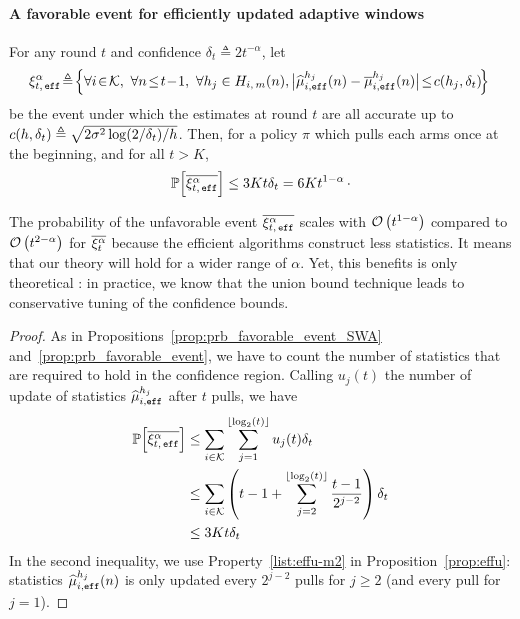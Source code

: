 \paragraph{A favorable event for efficiently updated adaptive windows}
\begin{proposition}
\label{prop:prb_favorable_event_eff}
For any round $t$ and confidence $\delta_{t} \triangleq 2t^{-\alpha}$, let 
%
\begin{equation*}
\!\HPeff\! \triangleq\! \Big\{ \forall i\!\in\!\arms,\ \forall n \!\leq\! t\!-\!1 ,\ \forall h_j \in \Him(n), \big| \hmueff(n) - \bmueff(n) \big| \!\leq\! c(h_j, \delta_{t}) \!\Big\}
\end{equation*}
 be the event under which the estimates at round $t$  are all accurate up to $c(h,\delta_{t}) \triangleq \sqrt{2 \sigma^2\log(2/\delta_t)/h}$. Then, for a policy $\pi$ which pulls each arms once at the beginning, and for all $t>K$,
\[
\mathbb{P}\Big[\overline{\xi^\alpha_{t,\, \texttt{eff}}}\Big] \leq 3Kt\delta_t= 6Kt^{1-\alpha}\,\cdot
\]
\end{proposition} 
\begin{remark}
The probability of the unfavorable event $\overline{\xi^\alpha_{t,\, \texttt{eff}}}$ scales with $\mathcal{O}\left(t^{1-\alpha}\right)$ compared to $\mathcal{O}\left(t^{2-\alpha}\right)$ for $\overline{\xi^\alpha_t}$ because the efficient algorithms construct less statistics. It means that our theory will hold for a wider range of $\alpha$. Yet, this benefits is only theoretical : in practice, we know that the union bound technique leads to conservative tuning of the confidence bounds. 
\end{remark}

\begin{proof}
As in Propositions~\ref{prop:prb_favorable_event_SWA} and~\ref{prop:prb_favorable_event}, we have to count the number of statistics that are required to hold in the confidence region. Calling $u_j(t)$ the number of update of statistics $\widehat{\mu}_{i,\texttt{eff}}^{h_j}$ after $t$ pulls, we have
\begin{align*}
    \mathbb{P}\Big[\overline{\xi^\alpha_{t,\, \texttt{eff}}}\Big] &\leq \sum_{i \in \mathcal{K}} \sum_{j=1}^{\left\lfloor\log_2\left(t\right)\right\rfloor} u_j(t) \delta_t \\
    &\leq \sum_{i \in \mathcal{K}} \left(t - 1  + \sum_{j=2}^{\left\lfloor\log_2\left(t\right)\right\rfloor} \frac{t-1}{2^{j-2}}\right) \delta_t \\
    &\leq 3Kt\delta_t
\end{align*}
In the second inequality, we use Property~\ref{list:effu-m2} in Proposition~\ref{prop:effu}: statistics $\widehat{\mu}_{i,\texttt{eff}}^{h_j}(n)$ is only updated every $2^{j-2}$ pulls for $j\geq 2$ (and every pull for $j=1$).
\end{proof}

